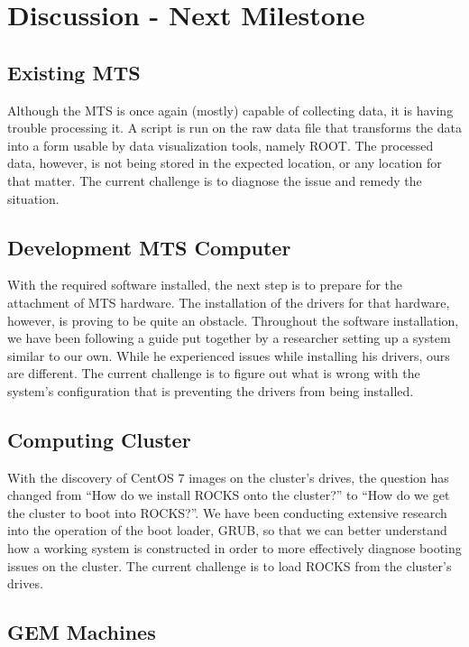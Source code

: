 \documentclass[12pt]{article}
\newcommand\tab[1][1cm]{\hspace*{#1}}
\begin{document}
\section{Discussion - Next Milestone}

\subsection{Existing MTS}

\tab Although the MTS is once again (mostly) capable of collecting data, it is
having trouble processing it. A script is run on the raw data file that
transforms the data into a form usable by data visualization tools, namely
ROOT. The processed data, however, is not being stored in the expected location,
or any location for that matter. The current challenge is to diagnose the issue
and remedy the situation.

\subsection{Development MTS Computer}

\tab With the required software installed, the next step is to prepare for the
attachment of MTS hardware. The installation of the drivers for that hardware,
however, is proving to be quite an obstacle. Throughout the software
installation, we have been following a guide put together by a researcher
setting up a system similar to our own. While he experienced issues while
installing his drivers, ours are different. The current challenge is to figure
out what is wrong with the system's configuration that is preventing the drivers
from being installed.

\subsection{Computing Cluster}

\tab With the discovery of CentOS 7 images on the cluster's drives, the question
has changed from ``How do we install ROCKS onto the cluster?'' to ``How do we
get the cluster to boot into ROCKS?''. We have been conducting extensive
research into the operation of the boot loader, GRUB, so that we can better
understand how a working system is constructed in order to more effectively
diagnose booting issues on the cluster. The current challenge is to load ROCKS
from the cluster's drives.

\subsection{GEM Machines}
\end{document}
